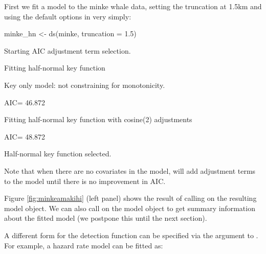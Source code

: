 \documentclass[article]{jss}
\begin{document}
First we fit a model to the minke whale data, setting the truncation at
1.5km and using the default options in  very simply:

\begin{CodeChunk}
\begin{CodeInput}
minke_hn <- ds(minke, truncation = 1.5)
\end{CodeInput}
\begin{CodeOutput}
Starting AIC adjustment term selection.
\end{CodeOutput}
\begin{CodeOutput}
Fitting half-normal key function
\end{CodeOutput}
\begin{CodeOutput}
Key only model: not constraining for monotonicity.
\end{CodeOutput}
\begin{CodeOutput}
AIC= 46.872
\end{CodeOutput}
\begin{CodeOutput}
Fitting half-normal key function with cosine(2) adjustments
\end{CodeOutput}
\begin{CodeOutput}
AIC= 48.872
\end{CodeOutput}
\begin{CodeOutput}

Half-normal key function selected.
\end{CodeOutput}
\end{CodeChunk}

Note that when there are no covariates in the model,  will add
adjustment terms to the model until there is no improvement in AIC.

Figure \ref{fig:minkeamakihi} (left panel) shows the result of calling
 on the resulting model object. We can also call
 on the model object to get summary information about the
fitted model (we postpone this until the next section).

A different form for the detection function can be specified via the
 argument to . For example, a hazard rate model can
be fitted as:
\end{document}
